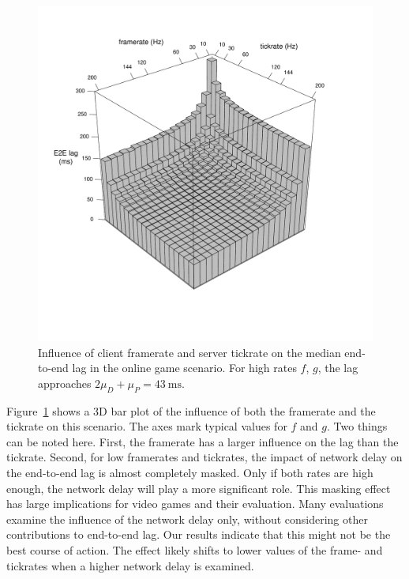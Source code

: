 \begin{figure}[!t]
	\centering
	\vspace{-6mm}
	\includegraphics[width=1.0\columnwidth]{../../simulation/visualization/e2e-lag-3dbars.pdf}
	\vspace{-15mm}
	\caption{Influence of client framerate and server tickrate on the median end-to-end lag in the online game scenario. For high rates $f$, $g$, the lag approaches $2\mu_D+\mu_P=\SI{43}{\milli\second}$.}
\label{fig:3dbars-framerate-tickrate-lag}
\end{figure}

Figure~\ref{fig:3dbars-framerate-tickrate-lag} shows a 3D bar plot of the influence of both the framerate and the tickrate on this scenario. The axes mark typical values for $f$ and $g$. Two things can be noted here. First, the framerate has a larger influence on the lag than the tickrate. Second, for low framerates and tickrates, the impact of network delay on the end-to-end lag is almost completely masked. Only if both rates are high enough, the network delay will play a more significant role. This masking effect has large implications for video games and their evaluation. Many evaluations examine the influence of the network delay only, without considering other contributions to end-to-end lag. Our results indicate that this might not be the best course of action. The effect likely shifts to lower values of the frame- and tickrates when a higher network delay is examined.

